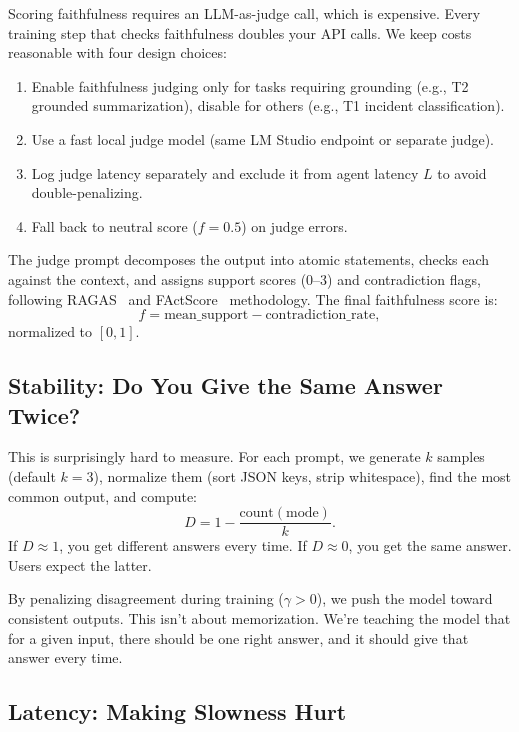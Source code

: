 \documentclass[11pt]{article}
\begin{document}
Scoring faithfulness requires an LLM-as-judge call, which is expensive.
Every training step that checks faithfulness doubles your API calls.
We keep costs reasonable with four design choices:
\begin{enumerate}[leftmargin=12pt]
    \item Enable faithfulness judging only for tasks requiring grounding (e.g., T2 grounded summarization), disable for others (e.g., T1 incident classification).
    \item Use a fast local judge model (same LM Studio endpoint or separate judge).
    \item Log judge latency separately and exclude it from agent latency $L$ to avoid double-penalizing.
    \item Fall back to neutral score ($f = 0.5$) on judge errors.
\end{enumerate}

The judge prompt decomposes the output into atomic statements, checks each against the context, and assigns support scores (0--3) and contradiction flags, following RAGAS~\citep{es2023ragas} and FActScore~\citep{min2023factscore} methodology.
The final faithfulness score is:
\begin{equation}
f = \text{mean\_support} - \text{contradiction\_rate},
\end{equation}
normalized to $[0,1]$.

\subsection{Stability: Do You Give the Same Answer Twice?}

This is surprisingly hard to measure.
For each prompt, we generate $k$ samples (default $k=3$), normalize them (sort JSON keys, strip whitespace), find the most common output, and compute:
\begin{equation}
D = 1 - \frac{\text{count}(\text{mode})}{k}.
\end{equation}
If $D \approx 1$, you get different answers every time.
If $D \approx 0$, you get the same answer.
Users expect the latter.

By penalizing disagreement during training ($\gamma > 0$), we push the model toward consistent outputs.
This isn't about memorization.  We're teaching the model that for a given input, there should be one right answer, and it should give that answer every time.

\subsection{Latency: Making Slowness Hurt}
\end{document}
